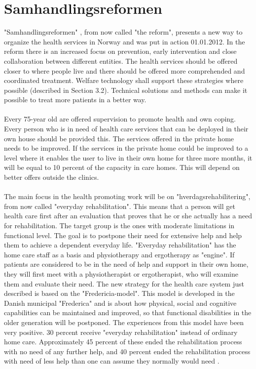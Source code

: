 \section{Samhandlingsreformen}
"Samhandlingsreformen" \cite{budsjett}\cite{regjering}, from now called "the reform", presents a new way to organize the health services in Norway and was put in action 01.01.2012. In the reform there is an increased focus on prevention, early intervention and close collaboration between different entities. The health services should be offered closer to where people live and there should be offered more comprehended and coordinated treatment. Welfare technology shall support these strategies where possible (described in Section 3.2). Technical solutions and methods can make it possible to treat more patients in a better way. \\ \\
Every 75-year old are offered supervision to promote health and own coping. Every person who is in need of health care services that can be deployed in their own house should be provided this. The services offered in the private home needs to be improved. If the services in the private home could be improved to a level where it enables the user to live in their own home for three more months, it will be equal to 10 percent of the capacity in care homes. This will depend on better offers outside the clinics.\\ \\ The main focus in the health promoting work will be on "hverdagsrehabilitering", from now called  "everyday rehabilitation". This means that a person will get health care first after an evaluation that proves that he or she actually has a need for rehabilitation. The target group is the ones with moderate limitations in functional level. The goal is to postpone their need for extensive help and help them to achieve a dependent everyday life.  "Everyday rehabilitation" has the home care staff as a basis and physiotherapy and ergotherapy as "engine". If patients are considered to be in the need of help and support in their own home, they will first meet with a physiotherapist or ergotherapist, who will examine them and evaluate their need. The new strategy for the health care system just described is based on the "Fredericia-model". This model is developed in the Danish municipal "Frederica" and is about how physical, social and cognitive capabilities can be maintained and improved, so that functional disabilities in the older generation will be postponed. The experiences from this model have been very positive. 30 percent receive "everyday rehabilitation" instead of ordinary home care. Approximately 45 percent of these ended the rehabilitation process with no need of any further help, and 40 percent ended the rehabilitation process with need of less help than one can assume they normally would need \cite{budsjett}\cite{regjering}.
